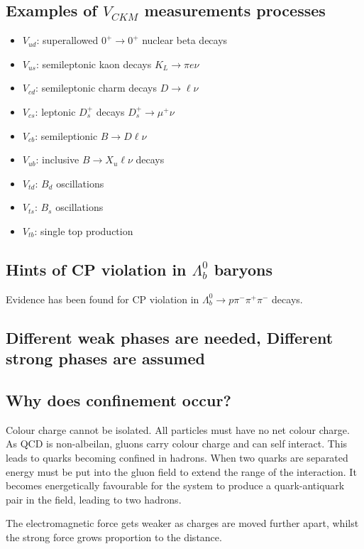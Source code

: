 \documentclass[12pt]{article}
\begin{document}
\subsection{Examples of $V_{CKM}$ measurements processes}
\begin{itemize}
\item $V_{ud}$: superallowed $0^+ \rightarrow 0^{+}$ nuclear beta decays
\item $V_{us}$: semileptonic kaon decays $K_{L} \rightarrow \pi e \nu$
\item $V_{cd}$: semileptonic charm decays $D\rightarrow \ell \nu$
\item $V_{cs}$: leptonic $D_{s}^+$ decays $D_{s}^{+} \rightarrow \mu^+ \nu$ 
\item $V_{cb}$: semileptionic $B \rightarrow D \ell \nu$ 
\item $V_{ub}$: inclusive $B \rightarrow X_{u} \ell \nu$ decays
\item $V_{td}$: $B_{d}$ oscillations  
\item $V_{ts}$: $B_{s}$ oscillations 
\item $V_{tb}$: single top production 

\end{itemize}


\subsection{Hints of CP violation in $\Lambda_{b}^{0}$ baryons}
Evidence has been found for CP violation in $\Lambda_{b}^{0} \rightarrow p \pi^{-} \pi^{+} \pi^{-}$ decays.

\subsection{Different weak phases are needed, Different strong phases are assumed}
\subsection{Why does confinement occur?}
Colour charge cannot be isolated. All particles must have no net colour charge. As QCD is non-albeilan, gluons carry colour charge and can self interact. This leads to quarks becoming confined in hadrons. When two quarks are separated energy must be put into the gluon field to extend the range of the interaction. It becomes energetically favourable for the system to produce a quark-antiquark pair in the field, leading to two hadrons. 

The electromagnetic force gets weaker as charges are moved further apart, whilst the strong force grows proportion to the distance.  
\end{document}
